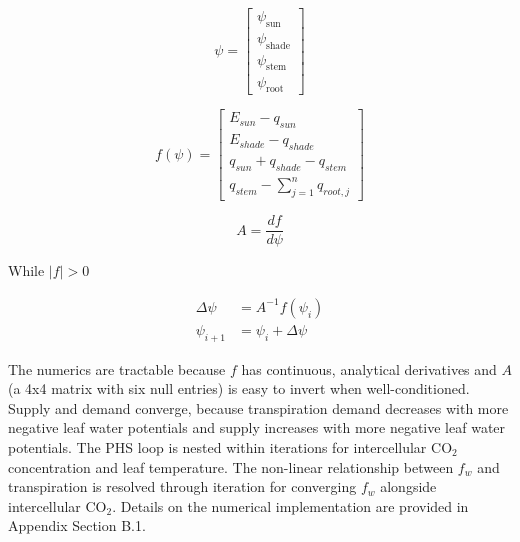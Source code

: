\documentclass[draft,linenumbers]{agujournal}
\begin{document}
    \begin{linenomath*}
    \begin{equation} 
    \psi = \left[
    \begin{array}{c}
    \psi_{\text{sun}} \\ 
    \psi_{\text{shade}} \\ 
    \psi_{\text{stem}} \\ 
    \psi_{\text{root}}            
    \end{array} \right]
    \end{equation}
    \end{linenomath*}
    
    \begin{linenomath*}
    \begin{equation}
    f\left(\psi\right) = \left[ 
    \begin{array}{c}
    E_{sun}-q_{sun}\\
    E_{shade}-q_{shade}\\
    q_{sun}+q_{shade}-q_{stem}\\
    q_{stem}-\sum_{j=1}^n{q_{root,j}}
    \end{array} \right]
    \end{equation}
    \end{linenomath*}
    
    \begin{linenomath*}
    \begin{equation}
    A = \dfrac{df}{d\psi}
    \end{equation}
    \end{linenomath*}    
    
    While $\left|f\right|>0$
    \begin{linenomath*}
    \begin{equation} \begin{aligned}
    \label{eq:iter}
    \Delta\psi &=A^{-1}f\left(\psi_i\right) \\
    \psi_{i+1}  &= \psi_i + \Delta\psi
    \end{aligned} \end{equation}
    \end{linenomath*}    
    
    The numerics are tractable because $f$ has continuous, analytical derivatives and $A$ (a 4x4 matrix with six null entries) is easy to invert when well-conditioned. Supply and demand converge, because transpiration demand decreases with more negative leaf water potentials and supply increases with more negative leaf water potentials. The PHS loop is nested within iterations for intercellular CO$_2$ concentration and leaf temperature. The non-linear relationship between $f_w$ and transpiration is resolved through iteration for converging $f_w$ alongside intercellular CO$_2$. Details on the numerical implementation are provided in Appendix Section B.1.
\end{document}
